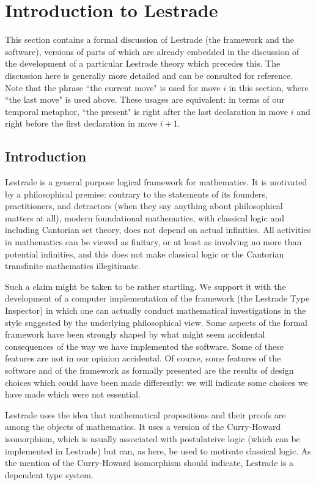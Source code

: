 \documentclass[12pt]{article}
\begin{document}
\section{Introduction to Lestrade}

This section contains a formal discussion of Lestrade (the framework and the software), versions of parts of which are already embedded in the discussion of the development of a particular Lestrade theory which precedes this.  The discussion here is generally more detailed and can be consulted for reference.  Note that the phrase ``the current move" is used for move $i$ in this section, where ``the last move" is used above.  These usages are equivalent:  in terms of our temporal metaphor, ``the present" is right after the last declaration in move $i$ and right before the first declaration in move $i+1$.

\subsection{Introduction}

Lestrade is a general purpose logical framework for mathematics.  It is motivated by a philosophical premise:  contrary to the statements of its founders, practitioners, and detractors (when they say anything about philosophical matters at all), modern foundational mathematics, with classical logic and including Cantorian set theory, does not depend on actual infinities.  All activities in mathematics can be viewed as finitary, or at least as involving no more than potential infinities, and this does not make classical logic or the Cantorian transfinite mathematics illegitimate.

Such a claim might be taken to be rather startling.  We support it with the development of a computer implementation of the framework (the Lestrade Type Inspector) in which one can actually conduct mathematical investigations in the style suggested by the underlying philosophical view.  Some aspects of the formal framework have been strongly shaped by what might seem accidental consequences of the way we have implemented the software.  Some of these features are not in our opinion accidental.  Of course, some features of the software and of the framework as formally presented are the results of design choices which could have been made differently:  we will indicate some choices we have made which were not essential.

Lestrade uses the idea that mathematical propositions and their proofs are among the objects of mathematics.  It uses a version of the Curry-Howard isomorphism, which is usually associated with postulateive logic (which can be implemented in Lestrade) but can, as here, be used to motivate classical logic.
As the mention of the Curry-Howard isomorphism should indicate, Lestrade is a dependent type system.
\end{document}
